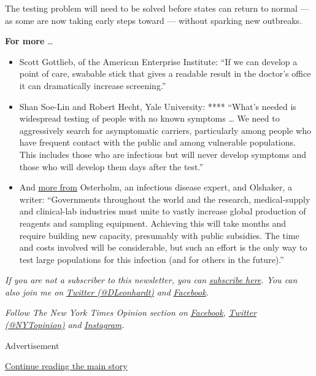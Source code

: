The testing problem will need to be solved before states can return to
normal --- as some are now taking early steps toward --- without
sparking new outbreaks.

\textbf{For more} \ldots{}

\begin{itemize}
\item
  Scott Gottlieb, of the American Enterprise Institute: ``If we can
  develop a point of care, swabable stick that gives a readable result
  in the doctor's office it can dramatically increase screening.''
\item
  Shan Soe-Lin and Robert Hecht, Yale University: **** ``What's needed
  is widespread testing of people with no known symptoms \ldots{} We
  need to aggressively search for asymptomatic carriers, particularly
  among people who have frequent contact with the public and among
  vulnerable populations. This includes those who are infectious but
  will never develop symptoms and those who will develop them days after
  the test.''
\item
  And
  \href{https://www.nytimes3xbfgragh.onion/2020/04/28/opinion/coronavirus-testing.html}{more
  from} Osterholm, an infectious disease expert, and Olshaker, a writer:
  ``Governments throughout the world and the research, medical-supply
  and clinical-lab industries must unite to vastly increase global
  production of reagents and sampling equipment. Achieving this will
  take months and require building new capacity, presumably with public
  subsidies. The time and costs involved will be considerable, but such
  an effort is the only way to test large populations for this infection
  (and for others in the future).''
\end{itemize}

\emph{If you are not a subscriber to this newsletter, you can}
\href{https://www.nytimes3xbfgragh.onion/newsletters/david-leonhardt}{\emph{subscribe
here}}\emph{. You can also join me on}
\href{https://twitter.com/DLeonhardt}{\emph{Twitter (@DLeonhardt)}}
\emph{and}
\href{https://www.facebookcorewwwi.onion/DavidRLeonhardt/}{\emph{Facebook}}\emph{.}

\emph{Follow The New York Times Opinion section on}
\href{https://www.facebookcorewwwi.onion/nytopinion}{\emph{Facebook}}\emph{,}
\href{http://twitter.com/NYTOpinion}{\emph{Twitter (@NYTopinion)}}
\emph{and}
\href{https://www.instagram.com/nytopinion/}{\emph{Instagram}}\emph{.}

Advertisement

\protect\hyperlink{after-bottom}{Continue reading the main story}

